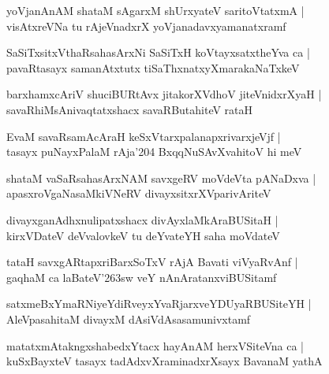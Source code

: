 \documentclass[twoside,12pt,openright]{book}
\def\S{\char'263}
\newcounter{shloka}[chapter]
\begin{document}
\begin{shloka}
yoVjanAnAM shataM sAgarxM shUrxyateV saritoVtatxmA |\\
visAtxreVNa tu rAjeVnadxrX yoVjanadavxyamanatxramf 
\end{shloka}

\begin{shloka}
SaSiTxsitxVthaRsahasArxNi SaSiTxH koVtayxsatxtheYva ca |\\
pavaRtasayx samanAtxtutx tiSaThxnatxyXmarakaNaTxkeV 
\end{shloka}

\begin{shloka}
barxhamxcAriV shuciBURtAvx jitakorXVdhoV jiteVnidxrXyaH |\\
savaRhiMsAnivaqtatxshacx savaRButahiteV rataH 
\end{shloka}

\begin{shloka}
EvaM savaRsamAcAraH keSxVtarxpalanapxrivarxjeVjf |\\
tasayx puNayxPalaM rAja\char'204 BxqqNuSAvXvahitoV hi meV
\end{shloka}

\begin{shloka}
shataM vaSaRsahasArxNAM savxgeRV moVdeVta pANaDxva |\\
apasxroVgaNasaMkiVNeRV divayxsitxrXVparivAriteV 
\end{shloka}

\begin{shloka}
divayxganAdhxnulipatxshacx divAyxlaMkAraBUSitaH |\\
kirxVDateV deVvalovkeV tu deYvateYH saha moVdateV 
\end{shloka}

\begin{shloka}
tataH savxgARtapxriBarxSoTxV rAjA Bavati viVyaRvAnf |\\
gaqhaM ca laBateV\S sw veY nAnAratanxviBUSitamf
\end{shloka}

\begin{shloka}
satxmeBxYmaRNiyeYdiRveyxYvaRjarxveYDUyaRBUSiteYH |\\
AleVpasahitaM divayxM dAsiVdAsasamunivxtamf
\end{shloka}

\begin{shloka}
matatxmAtakngxshabedxYtacx hayAnAM herxVSiteVna ca |\\
kuSxBayxteV tasayx tadAdxvXraminadxrXsayx BavanaM yathA
\end{shloka}
\end{document}
